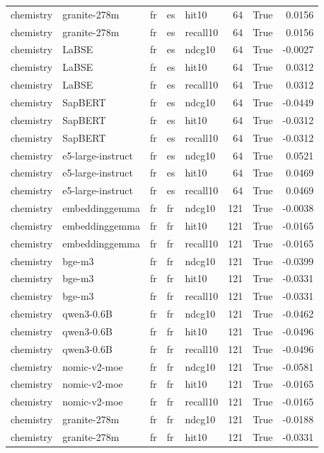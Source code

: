 \begin{tabular}{lllllrrr}
chemistry & granite-278m & fr & es & hit10 & 64 & True & 0.0156 \\
chemistry & granite-278m & fr & es & recall10 & 64 & True & 0.0156 \\
chemistry & LaBSE & fr & es & ndcg10 & 64 & True & -0.0027 \\
chemistry & LaBSE & fr & es & hit10 & 64 & True & 0.0312 \\
chemistry & LaBSE & fr & es & recall10 & 64 & True & 0.0312 \\
chemistry & SapBERT & fr & es & ndcg10 & 64 & True & -0.0449 \\
chemistry & SapBERT & fr & es & hit10 & 64 & True & -0.0312 \\
chemistry & SapBERT & fr & es & recall10 & 64 & True & -0.0312 \\
chemistry & e5-large-instruct & fr & es & ndcg10 & 64 & True & 0.0521 \\
chemistry & e5-large-instruct & fr & es & hit10 & 64 & True & 0.0469 \\
chemistry & e5-large-instruct & fr & es & recall10 & 64 & True & 0.0469 \\
chemistry & embeddinggemma & fr & fr & ndcg10 & 121 & True & -0.0038 \\
chemistry & embeddinggemma & fr & fr & hit10 & 121 & True & -0.0165 \\
chemistry & embeddinggemma & fr & fr & recall10 & 121 & True & -0.0165 \\
chemistry & bge-m3 & fr & fr & ndcg10 & 121 & True & -0.0399 \\
chemistry & bge-m3 & fr & fr & hit10 & 121 & True & -0.0331 \\
chemistry & bge-m3 & fr & fr & recall10 & 121 & True & -0.0331 \\
chemistry & qwen3-0.6B & fr & fr & ndcg10 & 121 & True & -0.0462 \\
chemistry & qwen3-0.6B & fr & fr & hit10 & 121 & True & -0.0496 \\
chemistry & qwen3-0.6B & fr & fr & recall10 & 121 & True & -0.0496 \\
chemistry & nomic-v2-moe & fr & fr & ndcg10 & 121 & True & -0.0581 \\
chemistry & nomic-v2-moe & fr & fr & hit10 & 121 & True & -0.0165 \\
chemistry & nomic-v2-moe & fr & fr & recall10 & 121 & True & -0.0165 \\
chemistry & granite-278m & fr & fr & ndcg10 & 121 & True & -0.0188 \\
chemistry & granite-278m & fr & fr & hit10 & 121 & True & -0.0331 \\

\end{tabular}
